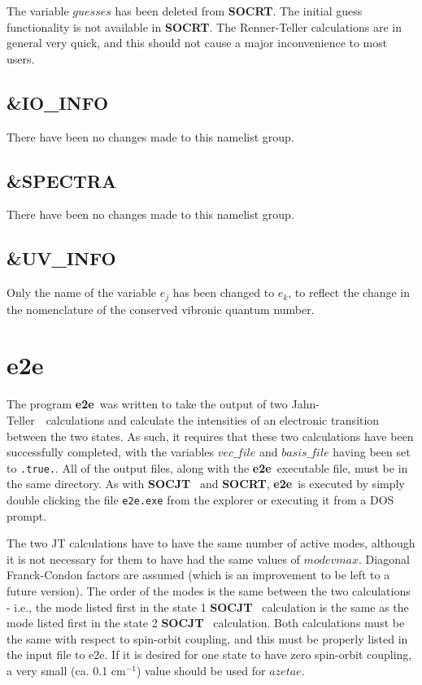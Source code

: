 \documentclass{article}
\newcommand{\wn}{cm$^{-1}$}
\newcommand{\JT}{Jahn-Teller\ }
\newcommand{\socjt}{{\bf SOCJT }}
\newcommand{\socrt}{{\bf SOCRT}}
\newcommand{\etoe}{{\bf e2e}}
\begin{document}
The variable $guesses$ has been deleted from \socrt . The initial
guess functionality is not available in \socrt . The Renner-Teller
calculations are in general very quick, and this should not cause a
major inconvenience to most users.

\subsection{\&IO\_INFO}

There have been no changes made to this namelist group.

\subsection{\&SPECTRA}

There have been no changes made to this namelist group.

\subsection{\&UV\_INFO}

Only the name of the variable $e_j$ has been changed to $e_k$, to
reflect the change in the nomenclature of the conserved vibronic
quantum number.

\section{\etoe } \label{section:e2e}

The program \etoe\ was written to take the output of two \JT\
calculations and calculate the intensities of an electronic transition
between the two states. As such, it requires that these two
calculations have been successfully completed, with the variables
$vec\_file$ and $basis\_file$ having been set to {\tt .true.}. All of
the output files, along with the \etoe\ executable file, must be in
the same directory. As with \socjt\ and \socrt , \etoe\ is executed by
simply double clicking the file {\tt e2e.exe} from the explorer or
executing it from a DOS prompt. 

The two JT calculations have to have the same number of active modes,
although it is not necessary for them to have had the same values of
$modevmax$. Diagonal Franck-Condon factors are assumed (which is an
improvement to be left to a future version). The order of the modes is
the same between the two calculations - i.e., the mode listed first in
the state 1 \socjt\ calculation is the same as the mode listed first in
the state 2 \socjt\ calculation. Both calculations must be the same
with respect to spin-orbit coupling, and this must be properly listed
in the input file to e2e. If it is desired for one state to have zero
spin-orbit coupling, a very small (ca. 0.1 \wn ) value should be used
for $azetae$.
\end{document}
